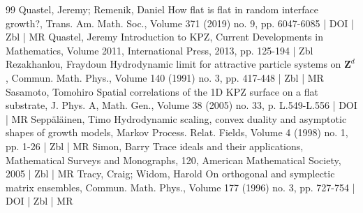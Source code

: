 \documentclass[10pt]{amsart}
\theoremstyle{definition}\newtheorem{defi}[theo]{Definition}\newtheorem{rema}[theo]{Remark}\newtheorem{exam}[theo]{Example}\newtheorem{exem}[theo]{Example}\newtheorem{nota}[theo]{Notation}
\begin{document}
\begin{thebibliography}{99}
Quastel, Jeremy; Remenik, Daniel How flat is flat in random interface growth?, Trans. Am. Math. Soc., Volume 371 (2019) no. 9, pp. 6047-6085 | DOI | Zbl | MR
Quastel, Jeremy Introduction to KPZ, Current Developments in Mathematics, Volume 2011, International Press, 2013, pp. 125-194 | Zbl
Rezakhanlou, Fraydoun Hydrodynamic limit for attractive particle systems on $\mathbf{Z}^d$, Commun. Math. Phys., Volume 140 (1991) no. 3, pp. 417-448 | Zbl | MR
Sasamoto, Tomohiro Spatial correlations of the 1D KPZ surface on a flat substrate, J. Phys. A, Math. Gen., Volume 38 (2005) no. 33, p. L.549-L.556 | DOI | MR
Seppäläinen, Timo Hydrodynamic scaling, convex duality and asymptotic shapes of growth models, Markov Process. Relat. Fields, Volume 4 (1998) no. 1, pp. 1-26 | Zbl | MR
Simon, Barry Trace ideals and their applications, Mathematical Surveys and Monographs, 120, American Mathematical Society, 2005 | Zbl | MR
Tracy, Craig; Widom, Harold On orthogonal and symplectic matrix ensembles, Commun. Math. Phys., Volume 177 (1996) no. 3, pp. 727-754 | DOI | Zbl | MR
\end{thebibliography}
\end{document}
